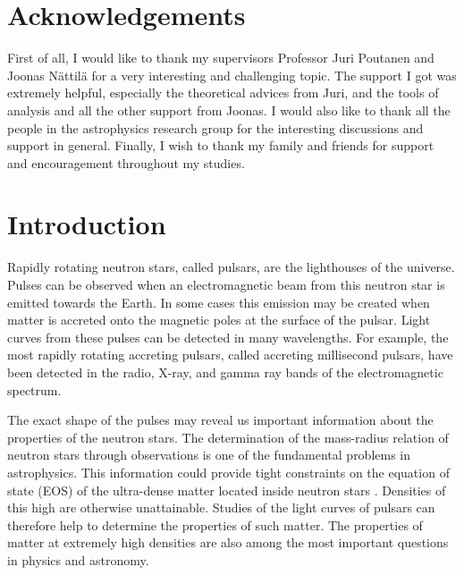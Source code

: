 \documentclass{wihuri}
\begin{document}
\section*{Acknowledgements}
First of all, I would like to thank my supervisors Professor Juri Poutanen and Joonas Nättilä for a very interesting and challenging topic. The support I got was extremely helpful, especially the theoretical advices from Juri, and the tools of analysis and all the other support from Joonas. I would also like to thank all the people in the astrophysics research group for the interesting discussions and support in
general. Finally, I wish to thank my family and friends %
for support and encouragement throughout my studies.
 
\newpage

\tableofcontents %

\newpage





\section*{Introduction}

Rapidly rotating neutron stars, called pulsars, are the lighthouses of the universe. Pulses can be observed when an electromagnetic beam from this neutron star is emitted towards the Earth.  In some cases this emission may be created when matter is accreted onto the magnetic poles at the surface of the pulsar. Light curves from these pulses can be detected in many wavelengths. For example, the most rapidly rotating accreting pulsars, called accreting millisecond pulsars, 
have been detected in the radio, X-ray, and gamma ray bands of the electromagnetic spectrum. %

The exact shape of the pulses may reveal us important information about the properties of the neutron stars. The determination of the mass-radius relation of neutron stars through observations is one of the fundamental problems in astrophysics. This information could provide tight constraints on the equation of state (EOS) of the ultra-dense matter located inside neutron stars \cite{lattimer2007} \cite{hebeler}. Densities of this high are otherwise unattainable.
Studies of the light curves of pulsars can therefore help to determine the properties of such matter. The properties of matter at extremely high densities are also among the most important questions in physics and astronomy. 
\end{document}
